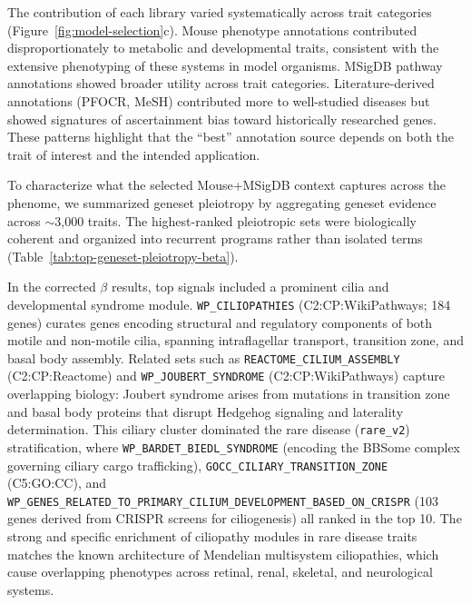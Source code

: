 The contribution of each library varied systematically across trait categories (Figure~\ref{fig:model-selection}c). Mouse phenotype annotations contributed disproportionately to metabolic and developmental traits, consistent with the extensive phenotyping of these systems in model organisms. MSigDB pathway annotations showed broader utility across trait categories. Literature-derived annotations (PFOCR, MeSH) contributed more to well-studied diseases but showed signatures of ascertainment bias toward historically researched genes. These patterns highlight that the ``best'' annotation source depends on both the trait of interest and the intended application.


To characterize what the selected Mouse+MSigDB context captures across the phenome, we summarized geneset pleiotropy by aggregating geneset evidence across $\sim$3,000 traits. The highest-ranked pleiotropic sets were biologically coherent and organized into recurrent programs rather than isolated terms (Table~\ref{tab:top-geneset-pleiotropy-beta}).

In the corrected $\beta$ results, top signals included a prominent cilia and developmental syndrome module. \texttt{WP\_CILIOPATHIES} (C2:CP:WikiPathways; 184 genes) curates genes encoding structural and regulatory components of both motile and non-motile cilia, spanning intraflagellar transport, transition zone, and basal body assembly\cite{reiter_cilia_2017}. Related sets such as \texttt{REACTOME\_CILIUM\_ASSEMBLY} (C2:CP:Reactome) and \texttt{WP\_JOUBERT\_SYNDROME} (C2:CP:WikiPathways) capture overlapping biology: Joubert syndrome arises from mutations in transition zone and basal body proteins that disrupt Hedgehog signaling and laterality determination\cite{parisi_mechanisms_2009}. This ciliary cluster dominated the rare disease (\texttt{rare\_v2}) stratification, where \texttt{WP\_BARDET\_BIEDL\_SYNDROME} (encoding the BBSome complex governing ciliary cargo trafficking\cite{nachury_bbsome_2007}), \texttt{GOCC\_CILIARY\_TRANSITION\_ZONE} (C5:GO:CC), and \texttt{WP\_GENES\_RELATED\_TO\_PRIMARY\_CILIUM\_DEVELOPMENT\_BASED\_ON\_CRISPR} (103 genes derived from CRISPR screens for ciliogenesis\cite{wheway_cilia_2015}) all ranked in the top 10. The strong and specific enrichment of ciliopathy modules in rare disease traits matches the known architecture of Mendelian multisystem ciliopathies, which cause overlapping phenotypes across retinal, renal, skeletal, and neurological systems.

